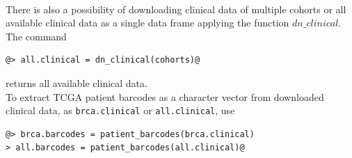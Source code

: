 \documentclass[a4paper,12pt,listof=totoc,bibliography=totoc]{scrartcl}
\begin{document}
\ \\
There is also a possibility of downloading clinical data of multiple cohorts or all available clinical data as a single data frame
applying the function $dn\_clinical$. The command
\begin{lstlisting}[style=base]
@> all.clinical = dn_clinical(cohorts)@
\end{lstlisting}
returns all available clinical data.\\
To extract TCGA patient barcodes as a character vector from downloaded clinical data, as {\tt brca.clinical} or {\tt all.clinical}, use
\begin{lstlisting}[style=base]
@> brca.barcodes = patient_barcodes(brca.clinical)
> all.barcodes = patient_barcodes(all.clinical)@
\end{lstlisting}
\end{document}
